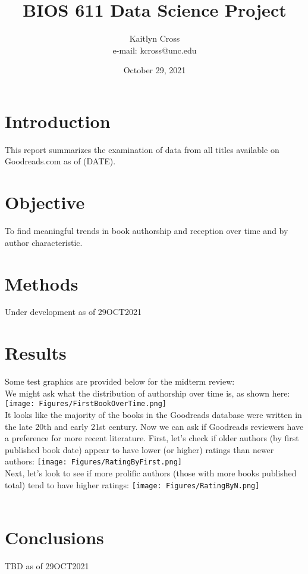 \documentclass{article}
\begin{document}
\title{BIOS 611 Data Science Project}
\author{Kaitlyn Cross \\ e-mail: kcross@unc.edu}
\date{October 29, 2021}
\maketitle
\section{Introduction}
This report summarizes the examination of data from all titles available on Goodreads.com as of (DATE).
\section{Objective}
To find meaningful trends in book authorship and reception over time and by author characteristic.
\section{Methods}
Under development as of 29OCT2021
\section{Results}
Some test graphics are provided below for the midterm review:
\\
We might ask what the distribution of authorship over time is, as shown here:
\\
\texttt{[image: Figures/FirstBookOverTime.png]}\\
It looks like the majority of the books in the Goodreads database were written in the late 20th and early 21st century.
Now we can ask if Goodreads reviewers have a preference for more recent literature.
First, let's check if older authors (by first published book date) appear to have lower (or higher) ratings than newer authors:
\texttt{[image: Figures/RatingByFirst.png]}\\
Next, let's look to see if more prolific authors (those with more books published total) tend to have higher ratings:
\texttt{[image: Figures/RatingByN.png]}\\
\\
\section{Conclusions}
TBD as of 29OCT2021
\end{document}
